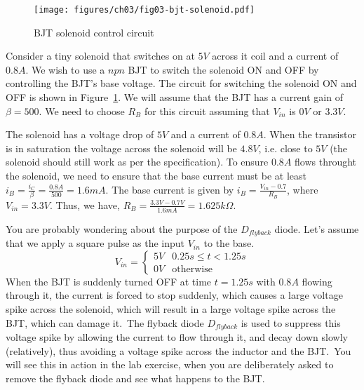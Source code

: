 \begin{figure}[htbp]
    \centering
    \texttt{[image: figures/ch03/fig03-bjt-solenoid.pdf]}
    \caption{BJT solenoid control circuit}
    \label{fig:03-bjt-solenoid}
\end{figure}
\begin{boxedstuff}
    \begin{example}
        Consider a tiny solenoid that switches on at $5V$ across it coil and a current of $0.8A$. We wish to use  a $npn$ BJT to switch the solenoid ON and OFF by controlling the BJT's base voltage. The circuit for switching the solenoid ON and OFF is shown in Figure~\ref{fig:03-bjt-solenoid}. We will assume that the BJT has a current gain of $\beta = 500$. We need to choose $R_B$ for this circuit assuming that $V_{in}$ is $0V$ or $3.3V$.

        The solenoid has a voltage drop of $5V$ and a current of $0.8A$. When the transistor is in saturation the voltage across the solenoid will be $4.8V$, i.e. close to $5V$ (the solenoid should still work as per the specification). To ensure $0.8A$ flows throught the solenoid, we need to ensure that the base current must be at least $i_B = \frac{i_C}{\beta} = \frac{0.8A}{500} = 1.6mA$. The base current is given by $i_B = \frac{V_{in} - 0.7}{R_B}$, where $V_{in} = 3.3V$. Thus, we have, $R_B = \frac{3.3V - 0.7V}{1.6mA} = 1.625k\Omega$.

        You are probably wondering about the purpose of the $D_{flyback}$ diode. Let's assume that we apply a square pulse as the input $V_{in}$ to the base. 
        \[ V_{in} = \begin{cases}
            5V & 0.25s \leq t < 1.25s \\
            0V & \text{otherwise}
        \end{cases}\]
        When the BJT is suddenly turned OFF at time $t=1.25s$ with $0.8A$ flowing through it, the current is forced to stop suddenly, which causes a large voltage spike across the solenoid, which will result in a large voltage spike across the BJT, which can damage it.\ The flyback diode $D_{flyback}$ is used to suppress this voltage spike by allowing the current to flow through it, and decay down slowly (relatively), thus avoiding a voltage spike across the inductor and the BJT.\ You will see this in action in the lab exercise, when you are deliberately asked to remove the flyback diode and see what happens to the BJT.\
    \end{example}
\end{boxedstuff}
